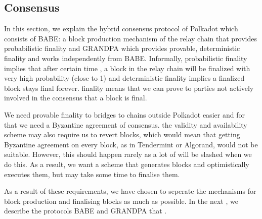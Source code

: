 \subsection{Consensus}\label{sec:consensus}

In this section, we explain the hybrid consensus protocol of Polkadot which consists of BABE: a block production mechanism of the relay chain that provides probabilistic finality and GRANDPA which provides provable, deterministic finality and works independently from BABE.  Informally, probabilistic finality implies that after certain time , a block in the relay chain will be finalized with very high probability (close to 1) and deterministic finality implies a finalized block stays final forever.  finality means that  we can prove to parties not actively involved in the consensus that a block is final.

We need provable finality to  bridges to chains outside Polkadot easier and for that we need a Byzantine agreement  of consensus.  the validity and availability scheme  may also require us to revert blocks, which would mean that getting Byzantine agreement on every block, as in Tendermint or Algorand, would not be suitable. However, this should happen rarely as a lot of  will be slashed when we do this. As a result, we want a scheme that generates blocks and optimistically executes them, but  may take some time to finalise them.  

As a result of these requirements, we have chosen to seperate the mechanisms for block production and finalising blocks as much as possible. In the next , we describe the protocols BABE and GRANDPA that .




